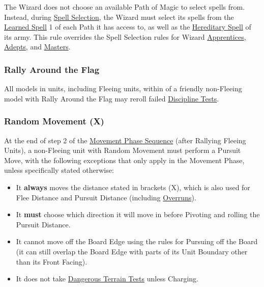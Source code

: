 The Wizard does not choose an available Path of Magic to select spells from. Instead, during \hyperref[spell_selection]{Spell Selection}, the Wizard must select its spells from the \hyperref[learned_spells]{Learned Spell} 1 of each Path it has access to, as well as the \hyperref[hereditary_spells]{Hereditary Spell} of its army. This rule overrides the Spell Selection rules for Wizard \hyperref[wizard_apprentice]{Apprentices}, \hyperref[wizard_adept]{Adepts}, and \hyperref[wizard_master]{Masters}.

\subsubsection{Rally Around the Flag}
\idx[main=y]{\rallyaroundtheflag}\label{rally_around_the_flag}

All models in units, including Fleeing units, within  of a friendly non-Fleeing model with Rally Around the Flag may reroll failed \hyperref[discipline_tests]{Discipline Tests}.

\columnbreak

\subsubsection{Random Movement (X)}
\idx[main=y]{\randommovement{}}\label{random_movement}

At the end of step 2 of the \hyperref[the_movement_phase_sequence]{Movement Phase Sequence} (after Rallying Fleeing Units), a non-Fleeing unit with Random Movement must perform a Pursuit Move, with the following exceptions that only apply in the Movement Phase, unless specifically stated otherwise:

\begin{itemize}
	\item It \textbf{always} moves the distance stated in brackets (X), which is also used for Flee Distance and Pursuit Distance (including \hyperref[overrun]{Overruns}).
	\item It \textbf{must} choose which direction it will move in before Pivoting and rolling the Pursuit Distance.
	\item It cannot move off the Board Edge using the rules for Pursuing off the Board (it can still overlap the Board Edge with parts of its Unit Boundary other than its Front Facing).
	\item It does not take \hyperref[dangerous_terrain]{Dangerous Terrain Tests} unless Charging.
\end{itemize}



